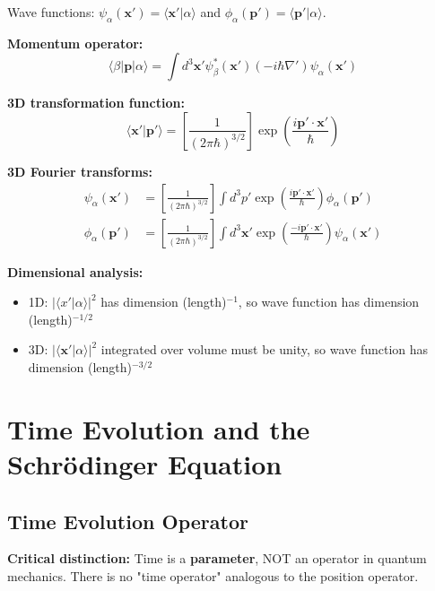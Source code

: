 \documentclass[11pt,a4paper]{article}
\begin{document}
Wave functions: $\psi_\alpha(\mathbf{x}') = \langle\mathbf{x}'|\alpha\rangle$ and $\phi_\alpha(\mathbf{p}') = \langle\mathbf{p}'|\alpha\rangle$.

\textbf{Momentum operator:}
\begin{equation}
\langle\beta|\mathbf{p}|\alpha\rangle = \int d^3\mathbf{x}'\psi_\beta^*(\mathbf{x}')(-i\hbar\nabla')\psi_\alpha(\mathbf{x}')
\tag{1.281}
\end{equation}

\textbf{3D transformation function:}
\begin{equation}
\boxed{\langle\mathbf{x}'|\mathbf{p}'\rangle = \left[\frac{1}{(2\pi\hbar)^{3/2}}\right]\exp\left(\frac{i\mathbf{p}' \cdot \mathbf{x}'}{\hbar}\right)}
\tag{1.282}
\end{equation}

\textbf{3D Fourier transforms:}
\begin{align}
\psi_\alpha(\mathbf{x}') &= \left[\frac{1}{(2\pi\hbar)^{3/2}}\right]\int d^3p'\exp\left(\frac{i\mathbf{p}' \cdot \mathbf{x}'}{\hbar}\right)\phi_\alpha(\mathbf{p}') \tag{1.283a} \\
\phi_\alpha(\mathbf{p}') &= \left[\frac{1}{(2\pi\hbar)^{3/2}}\right]\int d^3\mathbf{x}'\exp\left(\frac{-i\mathbf{p}' \cdot \mathbf{x}'}{\hbar}\right)\psi_\alpha(\mathbf{x}') \tag{1.283b}
\end{align}

\textbf{Dimensional analysis:}
\begin{itemize}
\item 1D: $|\langle x'|\alpha\rangle|^2$ has dimension (length)$^{-1}$, so wave function has dimension (length)$^{-1/2}$
\item 3D: $|\langle\mathbf{x}'|\alpha\rangle|^2$ integrated over volume must be unity, so wave function has dimension (length)$^{-3/2}$
\end{itemize}

\newpage
\section{Time Evolution and the Schrödinger Equation}

\subsection{Time Evolution Operator}

\textbf{Critical distinction:} Time is a \textbf{parameter}, NOT an operator in quantum mechanics. There is no "time operator" analogous to the position operator.
\end{document}

